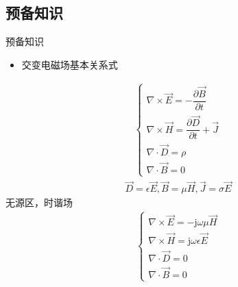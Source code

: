 \subsection{预备知识}
\begin{frame}{预备知识}
    \begin{itemize}
        \item 交变电磁场基本关系式
    \end{itemize}
    \begin{align*}
        \begin{cases}
            \nabla\times\vec{E}=-\dfrac{\partial \vec{B}}{\partial t}        \\
            \nabla\times\vec{H}=\dfrac{\partial \vec{D}}{\partial t}+\vec{J} \\
            \nabla\cdot\vec{D}=\rho                                          \\
            \nabla\cdot\vec{B}=0
        \end{cases}
    \end{align*}
    \begin{align*}
        \vec{D}=\epsilon\vec{E},\vec{B}=\mu\vec{H},\vec{J}=\sigma\vec{E}
    \end{align*}
    无源区，时谐场
    \begin{align*}
        \begin{cases}
            \nabla\times\vec{E}=-\mathrm{j}\omega\mu\vec{H}     \\
            \nabla\times\vec{H}=\mathrm{j}\omega\epsilon\vec{E} \\
            \nabla\cdot\vec{D}=0                                \\
            \nabla\cdot\vec{B}=0
        \end{cases}
    \end{align*}
\end{frame}


